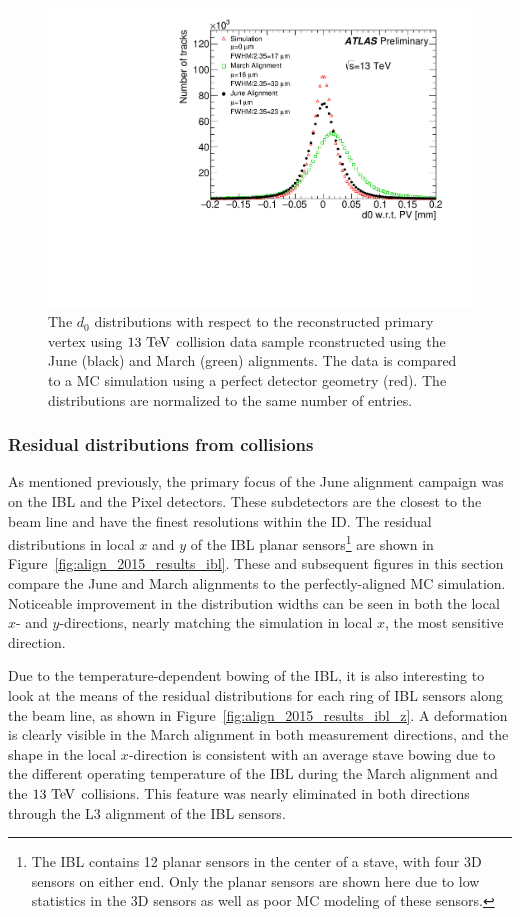 \begin{figure}[htbp]
  \centering
  \includegraphics[width=.48\textwidth]{figs/alignment/align2015/d0_pvcorr}
  \caption{The $d_0$ distributions with respect to the reconstructed primary vertex using $13\tev$ collision data sample rconstructed using the June (black) and March (green) alignments.  The data is compared to a MC simulation using a perfect detector geometry (red).  The distributions are normalized to the same number of entries.}
  \label{fig:align_2015_results_d0}
\end{figure}

\subsubsection{Residual distributions from collisions}\label{align:2015_results_residual}
As mentioned previously, the primary focus of the June alignment campaign was on the IBL and the Pixel detectors.
These subdetectors are the closest to the beam line and have the finest resolutions within the ID.
The residual distributions in local $x$ and $y$ of the IBL planar sensors\footnote{The IBL contains 12 planar sensors in the center of a stave, with four 3D sensors on either end.  Only the planar sensors are shown here due to low statistics in the 3D sensors as well as poor MC modeling of these sensors.} are shown in Figure~\ref{fig:align_2015_results_ibl}.
These and subsequent figures in this section compare the June and March alignments to the perfectly-aligned MC simulation.
Noticeable improvement in the distribution widths can be seen in both the local $x$- and $y$-directions, nearly matching the simulation in local $x$, the most sensitive direction.

Due to the temperature-dependent bowing of the IBL, it is also interesting to look at the means of the residual distributions for each ring of IBL sensors along the beam line, as shown in Figure~\ref{fig:align_2015_results_ibl_z}.
A deformation is clearly visible in the March alignment in both measurement directions, and the shape in the local $x$-direction is consistent with an average stave bowing due to the different operating temperature of the IBL during the March alignment and the $13\tev$ collisions.
This feature was nearly eliminated in both directions through the L3 alignment of the IBL sensors.

